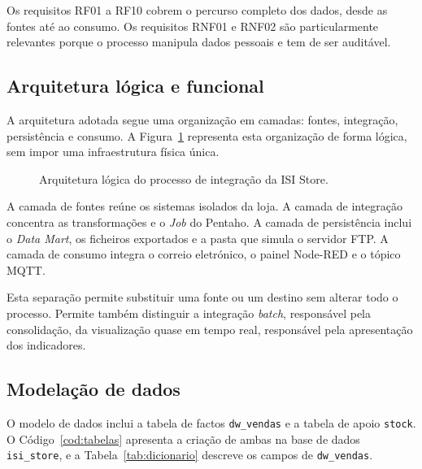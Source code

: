 \documentclass[11pt,a4paper]{article}
\begin{document}
Os requisitos RF01 a RF10 cobrem o percurso completo dos dados, desde as fontes até ao consumo. Os requisitos RNF01 e RNF02 são particularmente relevantes porque o processo manipula dados pessoais e tem de ser auditável.

\subsection{Arquitetura lógica e funcional}
A arquitetura adotada segue uma organização em camadas: fontes, integração, persistência e consumo. A Figura~\ref{fig:arquitetura} representa esta organização de forma lógica, sem impor uma infraestrutura física única.

\begin{figure}[H]
\centering
{}
\caption{Arquitetura lógica do processo de integração da ISI Store.}
\label{fig:arquitetura}
\end{figure}

A camada de fontes reúne os sistemas isolados da loja. A camada de integração concentra as transformações e o \textit{Job} do Pentaho. A camada de persistência inclui o \textit{Data Mart}, os ficheiros exportados e a pasta que simula o servidor FTP. A camada de consumo integra o correio eletrónico, o painel Node-RED e o tópico MQTT.

Esta separação permite substituir uma fonte ou um destino sem alterar todo o processo. Permite também distinguir a integração \textit{batch}, responsável pela consolidação, da visualização quase em tempo real, responsável pela apresentação dos indicadores.

\subsection{Modelação de dados}
O modelo de dados inclui a tabela de factos \texttt{dw\_vendas} e a tabela de apoio \texttt{stock}. O Código~\ref{cod:tabelas} apresenta a criação de ambas na base de dados \texttt{isi\_store}, e a Tabela~\ref{tab:dicionario} descreve os campos de \texttt{dw\_vendas}.
\end{document}
